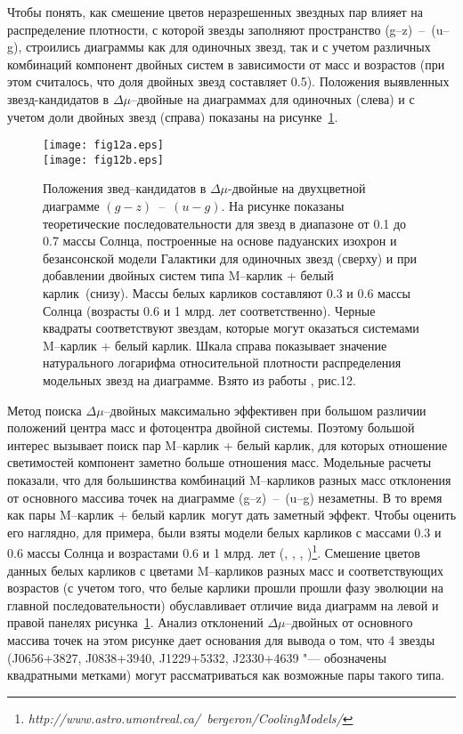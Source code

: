 Чтобы понять, как смешение цветов неразрешенных звездных пар влияет на распределение плотности, с которой звезды заполняют пространство (g--z)~--~(u--g), строились диаграммы как для одиночных звезд, так и с учетом различных комбинаций компонент двойных систем в зависимости от масс и возрастов (при этом считалось, что доля двойных звезд составляет 0.5).  Положения выявленных звезд-кандидатов в $\Delta\mu$--двойные на диаграммах для одиночных (слева) и с учетом доли двойных звезд (справа) показаны на рисунке~\ref{fig:15color}.

\begin{figure}[h]
\centering
\texttt{[image: fig12a.eps]}\\
\texttt{[image: fig12b.eps]}
\caption{Положения звед--кандидатов в $\Delta\mu$-двойные на двухцветной диаграмме $(g-z)$~--~$(u-g)$. На рисунке показаны теоретические последовательности для звезд в диапазоне от 0.1 до 0.7 массы Солнца, построенные на основе падуанских изохрон и безансонской модели Галактики для одиночных звезд (сверху) и при добавлении двойных систем типа  \glqq M--карлик + белый карлик\grqq\ (снизу). Массы белых карликов составляют 0.3 и 0.6 массы Солнца (возрасты 0.6 и 1 млрд. лет соответственно). Черные квадраты соответствуют звездам, которые могут оказаться системами  \glqq M--карлик + белый карлик\grqq . Шкала справа показывает значение натурального логарифма относительной плотности распределения модельных звезд на диаграмме. Взято из работы \cite{2015AstL...41..833K}, рис.12.}
\label{fig:15color}
\end{figure}

Метод поиска $\Delta\mu$--двойных максимально эффективен при большом различии положений центра масс и фотоцентра двойной системы. Поэтому большой интерес вызывает поиск пар \glqq M--карлик + белый карлик\grqq , для которых отношение светимостей компонент заметно больше отношения масс. Модельные расчеты показали, что для большинства комбинаций M--карликов разных масс отклонения от основного массива точек на диаграмме (g--z)~--~(u--g) незаметны. В то время как пары \glqq M--карлик + белый карлик\grqq\ могут дать заметный эффект. Чтобы оценить его наглядно, для примера, были взяты модели белых карликов  с массами 0.3 и 0.6 массы Солнца и возрастами 0.6 и 1 млрд. лет (\cite{2006AJ....132.1221H}, \cite{2011ApJ...737...28B}, \cite{2006ApJ...651L.137K}, \cite{2011ApJ...730..128T})\footnote{\textit{http://www.astro.umontreal.ca/~bergeron/CoolingModels/}}. Смешение цветов данных белых карликов с цветами M--карликов разных масс и соответствующих возрастов (с учетом того, что белые карлики прошли прошли фазу эволюции на главной последовательности) обуславливает отличие вида диаграмм на левой и правой панелях рисунка~\ref{fig:15color}.  Анализ отклонений $\Delta\mu$--двойных от основного массива точек на этом рисунке дает основания для вывода о том, что 4 звезды (J0656+3827, J0838+3940, J1229+5332, J2330+4639 "--- обозначены квадратными метками) могут рассматриваться как возможные пары такого типа.


